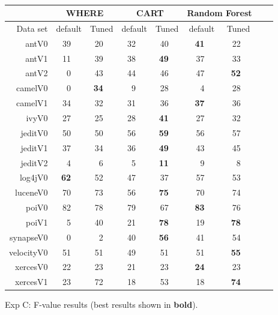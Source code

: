 \documentclass{acm_proc_article-sp}
\begin{document}
\begin{figure}[!t]
\renewcommand{\baselinestretch}{0.8} 

\scriptsize  
~~~\begin{tabular}{r|rl|rl|rl|rl|rl|rlrl}
      &   \multicolumn{4}{c|}{WHERE}         &   \multicolumn{4}{c|}{CART}         &   \multicolumn{4}{c}{Random Forest}         \\\hline
  Data set   &   \multicolumn{2}{c}{default}         &   \multicolumn{2}{c|}{Tuned}         &   \multicolumn{2}{c}{default}         &   \multicolumn{2}{c|}{Tuned}    &   \multicolumn{2}{c}{default}  &   \multicolumn{2}{c}{Tuned}\\\hline
antV0 & 39 &   & 20 &   & 32 &   & 40 &   & {\bf 41} &   & 22 &  \\
antV1 & 11 &   & 39 &   & 38 &   & {\bf 49} &   & 37 &   & 33 &  \\
antV2 & 0 &   & 43 &   & 44 &   & 46 &   & 47 &   & {\bf 52} &  \\
camelV0 & 0 &   & {\bf 34} &   & 9 &   & 28 &   & 4 &   & 28 &  \\
camelV1 & 34 &   & 32 &   & 31 &   & 36 &   & {\bf 37} &   & 36 &  \\
ivyV0 & 27 &   & 25 &   & 28 &   & {\bf 41} &   & 27 &   & 32 &  \\
jeditV0 & 50 &   & 50 &   & 56 &   & {\bf 59} &   & 56 &   & 57 &  \\
jeditV1 & 37 &   & 34 &   & 36 &   & {\bf 49} &   & 43 &   & 45 &  \\
jeditV2 & 4 &   & 6 &   & 5 &   & {\bf 11} &   & 9 &   & 8 &  \\
log4jV0 & {\bf 62} &   & 52 &   & 47 &   & 37 &   & 57 &   & 53 &  \\
luceneV0 & 70 &   & 73 &   & 56 &   & {\bf 75} &   & 70 &   & 74 &  \\
poiV0 & 82 &   & 78 &   & 79 &   & 67 &   & {\bf 83} &   & 76 &  \\
poiV1 & 5 &   & 40 &   & 21 &   & {\bf 78} &   & 19 &   & {\bf 78} &  \\
synapseV0 & 0 &   & 2 &   & 40 &   & {\bf 56} &   & 41 &   & 54 &  \\
velocityV0 & 51 &   & 51 &   & 49 &   & 51 &   & 51 &   & {\bf 55} &  \\
xercesV0 & 22 &   & 23 &   & 21 &   & 23 &   & {\bf 24} &   & 23 &  \\
xercesV1 & 23 &   & 72 &   & 18 &   & 53 &   & 18 &   & {\bf 74} &  \\

\end{tabular}
\caption{ Exp C: F-value results (best results  shown in {\bf bold}).}
\label{fig:fbars}
\end{figure}
\end{document}
